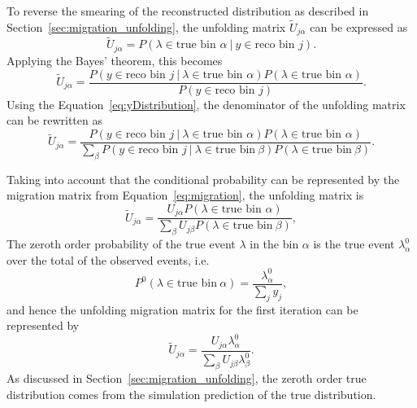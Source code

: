 To reverse the smearing of the reconstructed distribution as described in Section~\ref{sec:migration_unfolding}, the unfolding matrix $\tilde{U}_{j\alpha}$ can be expressed as
\begin{equation}
    \label{eq:unfoldingMatrix}
    \tilde{U}_{j\alpha} = P(\lambda \in \text{true bin } \alpha~|~y \in \text{reco bin }j).
\end{equation}
Applying the Bayes' theorem, this becomes
\begin{equation}
    \label{eq:unfoldingMatrix2}
    \tilde{U}_{j\alpha} = \frac{P(y \in \text{reco bin } j~|~\lambda \in \text{true bin }\alpha) P(\lambda \in \text{true bin } \alpha)}{P(y \in \text{reco bin } j)}.
\end{equation}
Using the Equation~\ref{eq:yDistribution}, the denominator of the unfolding matrix can be rewritten as
\begin{equation}
    \label{eq:unfoldingMatrix3}
    \tilde{U}_{j\alpha} = \frac{P(y \in \text{reco bin } j~|~\lambda \in \text{true bin }\alpha) P(\lambda \in \text{true bin } \alpha)}{\sum_{\beta}
    P(y \in \text{reco bin } j~|~\lambda \in \text{true bin}~\beta) P(\lambda \in \text{true bin}~\beta)}.
\end{equation}

Taking into account that the conditional probability can be represented by the migration matrix from Equation~\ref{eq:migration}, the unfolding matrix is
\begin{equation}
    \label{eq:unfoldingMatrix4}
    \tilde{U}_{j\alpha} = \frac{U_{j\alpha} P(\lambda \in \text{true bin } \alpha)}{\sum_{\beta}
    U_{j\beta} P(\lambda \in \text{true bin}~\beta)}, 
\end{equation}
The zeroth order probability of the true event $\lambda$ in the bin $\alpha$ is the true event $\lambda_{\alpha}^0$ over the total of the observed events, i.e. 
\begin{equation}
    \label{eq:zerothOrder}
    P^0(\lambda \in \text{true bin}~\alpha) = \frac{\lambda_{\alpha}^0}{\sum_{j}y_{j}}, 
\end{equation}
and hence the unfolding migration matrix for the first iteration can be represented by
\begin{equation}
    \label{eq:unfoldingMatrix5}
    \tilde{U}_{j\alpha} = \frac{U_{j\alpha} \lambda_{\alpha}^0}{\sum_{\beta}
    U_{j\beta} \lambda_{\beta}^0}.
\end{equation}
As discussed in Section~\ref{sec:migration_unfolding}, the zeroth order true distribution comes from the simulation prediction of the true distribution.

